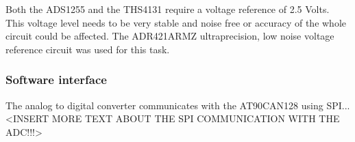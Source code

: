 Both the ADS1255 and the THS4131 require a voltage reference of 2.5 Volts. This voltage level needs to be very stable and noise free or accuracy of the whole circuit could be affected. The ADR421ARMZ ultraprecision, low noise voltage reference circuit was used for this task.

\subsubsection{Software interface}
The analog to digital converter communicates with the \newline
AT90CAN128 using SPI...  <INSERT MORE TEXT ABOUT THE SPI COMMUNICATION WITH THE ADC!!!>







\newpage